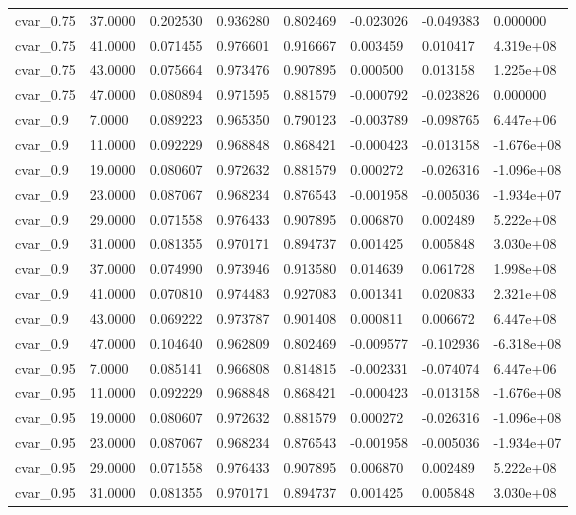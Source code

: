 \documentclass[11pt]{report}
\begin{document}
\begin{longtable}{llllllll}
cvar\_0.75 & 37.0000 & 0.202530 & 0.936280 & 0.802469 & -0.023026 & -0.049383 & 0.000000 \\
cvar\_0.75 & 41.0000 & 0.071455 & 0.976601 & 0.916667 & 0.003459 & 0.010417 & 4.319e+08 \\
cvar\_0.75 & 43.0000 & 0.075664 & 0.973476 & 0.907895 & 0.000500 & 0.013158 & 1.225e+08 \\
cvar\_0.75 & 47.0000 & 0.080894 & 0.971595 & 0.881579 & -0.000792 & -0.023826 & 0.000000 \\
cvar\_0.9 & 7.0000 & 0.089223 & 0.965350 & 0.790123 & -0.003789 & -0.098765 & 6.447e+06 \\
cvar\_0.9 & 11.0000 & 0.092229 & 0.968848 & 0.868421 & -0.000423 & -0.013158 & -1.676e+08 \\
cvar\_0.9 & 19.0000 & 0.080607 & 0.972632 & 0.881579 & 0.000272 & -0.026316 & -1.096e+08 \\
cvar\_0.9 & 23.0000 & 0.087067 & 0.968234 & 0.876543 & -0.001958 & -0.005036 & -1.934e+07 \\
cvar\_0.9 & 29.0000 & 0.071558 & 0.976433 & 0.907895 & 0.006870 & 0.002489 & 5.222e+08 \\
cvar\_0.9 & 31.0000 & 0.081355 & 0.970171 & 0.894737 & 0.001425 & 0.005848 & 3.030e+08 \\
cvar\_0.9 & 37.0000 & 0.074990 & 0.973946 & 0.913580 & 0.014639 & 0.061728 & 1.998e+08 \\
cvar\_0.9 & 41.0000 & 0.070810 & 0.974483 & 0.927083 & 0.001341 & 0.020833 & 2.321e+08 \\
cvar\_0.9 & 43.0000 & 0.069222 & 0.973787 & 0.901408 & 0.000811 & 0.006672 & 6.447e+08 \\
cvar\_0.9 & 47.0000 & 0.104640 & 0.962809 & 0.802469 & -0.009577 & -0.102936 & -6.318e+08 \\
cvar\_0.95 & 7.0000 & 0.085141 & 0.966808 & 0.814815 & -0.002331 & -0.074074 & 6.447e+06 \\
cvar\_0.95 & 11.0000 & 0.092229 & 0.968848 & 0.868421 & -0.000423 & -0.013158 & -1.676e+08 \\
cvar\_0.95 & 19.0000 & 0.080607 & 0.972632 & 0.881579 & 0.000272 & -0.026316 & -1.096e+08 \\
cvar\_0.95 & 23.0000 & 0.087067 & 0.968234 & 0.876543 & -0.001958 & -0.005036 & -1.934e+07 \\
cvar\_0.95 & 29.0000 & 0.071558 & 0.976433 & 0.907895 & 0.006870 & 0.002489 & 5.222e+08 \\
cvar\_0.95 & 31.0000 & 0.081355 & 0.970171 & 0.894737 & 0.001425 & 0.005848 & 3.030e+08 \\

\end{longtable}
\end{document}
